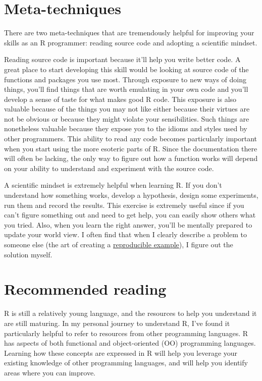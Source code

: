 \section{Meta-techniques}\label{meta-techniques}

There are two meta-techniques that are tremendously helpful for
improving your skills as an R programmer: reading source code and
adopting a scientific mindset.

Reading source code is important because it'll help you write better
code. A great place to start developing this skill would be looking at
source code of the functions and packages you use most. Through exposure
to new ways of doing things, you'll find things that are worth emulating
in your own code and you'll develop a sense of taste for what makes good
R code. This exposure is also valuable because of the things you may not
like either because their virtues are not be obvious or because they
might violate your sensibilities. Such things are nonetheless valuable
because they expose you to the idioms and styles used by other
programmers. This ability to read any code becomes particularly
important when you start using the more esoteric parts of R. Since the
documentation there will often be lacking, the only way to figure out
how a function works will depend on your ability to understand and
experiment with the source code.

A scientific mindset is extremely helpful when learning R. If you don't
understand how something works, develop a hypothesis, design some
experiments, run them and record the results. This exercise is extremely
useful since if you can't figure something out and need to get help, you
can easily show others what you tried. Also, when you learn the right
answer, you'll be mentally prepared to update your world view. I often
find that when I clearly describe a problem to someone else (the art of
creating a
\href{http://stackoverflow.com/questions/5963269}{reproducible
example}), I figure out the solution myself.

\section{Recommended reading}\label{recommended-reading}

R is still a relatively young language, and the resources to help you
understand it are still maturing. In my personal journey to understand
R, I've found it particularly helpful to refer to resources from other
programming languages. R has aspects of both functional and
object-oriented (OO) programming languages. Learning how these concepts
are expressed in R will help you leverage your existing knowledge of
other programming languages, and will help you identify areas where you
can improve.

